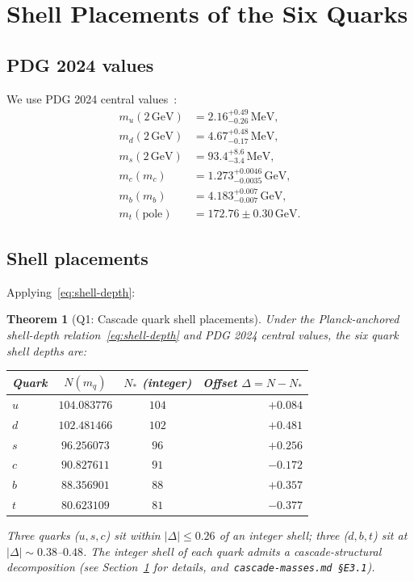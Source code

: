 \documentclass[12pt]{article}
\newtheorem{theorem}{Theorem}
\theoremstyle{definition}
\theoremstyle{remark}
\begin{document}
\section{Shell Placements of the Six Quarks}\label{sec:placements}

\subsection{PDG 2024 values}

We use PDG 2024 central values~\citep{PDG2024}:
\begin{align}
m_u(2\,\mathrm{GeV}) &= 2.16^{+0.49}_{-0.26}\,\mathrm{MeV},\\
m_d(2\,\mathrm{GeV}) &= 4.67^{+0.48}_{-0.17}\,\mathrm{MeV},\\
m_s(2\,\mathrm{GeV}) &= 93.4^{+8.6}_{-3.4}\,\mathrm{MeV},\\
m_c(m_c) &= 1.273^{+0.0046}_{-0.0035}\,\mathrm{GeV},\\
m_b(m_b) &= 4.183^{+0.007}_{-0.007}\,\mathrm{GeV},\\
m_t(\mathrm{pole}) &= 172.76 \pm 0.30\,\mathrm{GeV}.
\end{align}

\subsection{Shell placements}

Applying~\eqref{eq:shell-depth}:

\begin{theorem}[Q1: Cascade quark shell placements]\label{prop:placements}
Under the Planck-anchored shell-depth relation~\eqref{eq:shell-depth} and PDG 2024 central values, the six quark shell depths are:
\begin{center}
\begin{tabular}{@{}lccr@{}}
\toprule
Quark & $N(m_q)$ & $N_*$ (integer) & Offset $\Delta = N - N_*$ \\
\midrule
$u$ & $104.083776$ & $104$ & $+0.084$ \\
$d$ & $102.481466$ & $102$ & $+0.481$ \\
$s$ & $96.256073$ & $96$ & $+0.256$ \\
$c$ & $90.827611$ & $91$ & $-0.172$ \\
$b$ & $88.356901$ & $88$ & $+0.357$ \\
$t$ & $80.623109$ & $81$ & $-0.377$ \\
\bottomrule
\end{tabular}
\end{center}
Three quarks ($u, s, c$) sit within $|\Delta| \le 0.26$ of an integer shell; three ($d, b, t$) sit at $|\Delta| \sim 0.38$--$0.48$. The integer shell of each quark admits a cascade-structural decomposition (see Section~\ref{sec:placements} for details, and~\texttt{cascade-masses.md §E3.1}).
\end{theorem}
\end{document}
